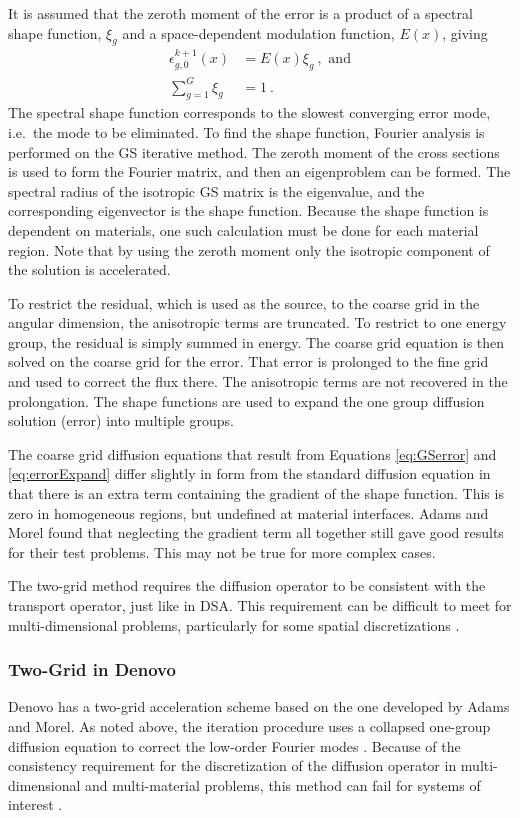 It is assumed that the zeroth moment of the error is a product of a spectral shape function, $\xi_g$ and a space-dependent modulation function, $E(x)$, giving
%
\begin{align}
  \epsilon_{g,0}^{k+1}(x) &= E(x)\xi_{g} \:, \text{ and} \label{eq:errorExpand} \\
  \sum_{g=1}^{G} \xi_{g} &= 1 \:.
\end{align} 
%
The spectral shape function corresponds to the slowest converging error mode, i.e.\ the mode to be eliminated. To find the shape function, Fourier analysis is performed on the GS iterative method. The zeroth moment of the cross sections is used to form the Fourier matrix, and then an eigenproblem can be formed. The spectral radius of the isotropic GS matrix is the eigenvalue, and the corresponding eigenvector is the shape function. Because the shape function is dependent on materials, one such calculation must be done for each material region. Note that by using the zeroth moment only the isotropic component of the solution is accelerated.

To restrict the residual, which is used as the source, to the coarse grid in the angular dimension, the anisotropic terms are truncated. To restrict to one energy group, the residual is simply summed in energy. The coarse grid equation is then solved on the coarse grid for the error. That error is prolonged to the fine grid and used to correct the flux there. The anisotropic terms are not recovered in the prolongation. The shape functions are used to expand the one group diffusion solution (error) into multiple groups. 

The coarse grid diffusion equations that result from Equations \eqref{eq:GSerror} and \eqref{eq:errorExpand} differ slightly in form from the standard diffusion equation in that there is an extra term containing the gradient of the shape function. This is zero in homogeneous regions, but undefined at material interfaces. Adams and Morel found that neglecting the gradient term all together still gave good results for their test problems. This may not be true for more complex cases.

The two-grid method requires the diffusion operator to be consistent with the transport operator, just like in DSA. This requirement can be difficult to meet for multi-dimensional problems, particularly for some spatial discretizations \cite{Adams1993}. 

\subsubsection{Two-Grid in Denovo}
\label{sec:TTG}
Denovo has a two-grid acceleration scheme based on the one developed by Adams and Morel. As noted above, the iteration procedure uses a collapsed one-group diffusion equation to correct the low-order Fourier modes \cite{Adams1993}. Because of the consistency requirement for the discretization of the diffusion operator in multi-dimensional and multi-material problems, this method can fail for systems of interest \cite{Evans2009d}. 

